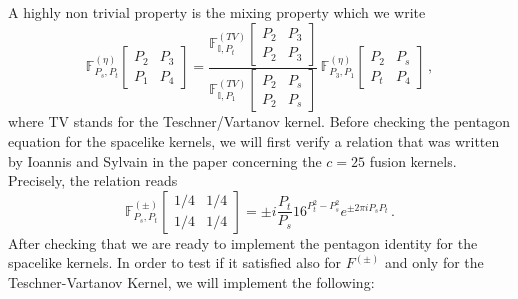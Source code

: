 \documentclass[11pt]{article}
\begin{document}
A highly non trivial property is the mixing property which we write
\begin{equation}\label{eq:mixingproperty}
    \mathbb{F}_{P_s,P_t}^{(\eta)}\begin{bmatrix}
     P_2 & P_3 \\
     P_1 & P_4
    \end{bmatrix}=\frac{\mathbb{F}_{\mathbb{I},P_t}^{(TV)}\begin{bmatrix}
     P_2 & P_3 \\
     P_2 & P_3
    \end{bmatrix}}{\mathbb{F}_{\mathbb{I},P_1}^{(TV)}\begin{bmatrix}
     P_2 & P_s \\
     P_2 & P_s
    \end{bmatrix}}\,\mathbb{F}_{P_3,P_1}^{(\eta)}\begin{bmatrix}
     P_2 & P_s \\
     P_t & P_4
    \end{bmatrix}\,,
\end{equation}
where TV stands for the Teschner/Vartanov kernel.
Before checking the pentagon equation for the spacelike kernels, we will first verify a relation that was written by Ioannis and Sylvain in the paper concerning the $c=25$ fusion kernels. Precisely, the relation reads
\begin{equation}\label{eq:RibaultTsiares}
    \mathbb{F}^{(\pm)}_{P_s,P_t}\begin{bmatrix}
     1/4 & 1/4 \\
     1/4 & 1/4
    \end{bmatrix}=\pm i \frac{P_t}{P_s}16^{P_t^2-P_s^2}e^{\pm 2\pi i P_s P_t}\,.
\end{equation}
After checking that we are ready to implement the pentagon identity for the spacelike kernels. In order to test if it satisfied also for $F^{(\pm)}$ and only for the Teschner-Vartanov Kernel, we will implement the following:
\end{document}
